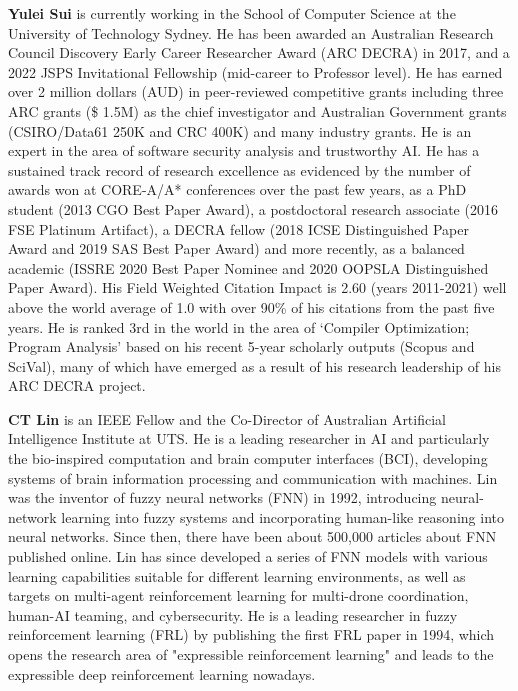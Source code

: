 \textbf{Yulei Sui} is currently working in the School of Computer Science at the University of Technology Sydney. 
He has been awarded an Australian Research Council Discovery Early Career Researcher Award (ARC DECRA) in 2017, and a 2022 JSPS Invitational Fellowship (mid-career to Professor level). 
He has earned over 2 million dollars (AUD) in peer-reviewed competitive grants including three ARC grants (\$ 1.5M) as the chief investigator and Australian Government grants (CSIRO/Data61 250K and CRC 400K) and many industry grants.
He is an expert in the area of software security analysis and trustworthy AI.
He has a sustained track record of research excellence as evidenced by the number of awards won at CORE-A/A* conferences over the past few years, as a PhD student (2013 CGO Best Paper Award), a postdoctoral research associate (2016 FSE Platinum Artifact), a DECRA fellow (2018 ICSE Distinguished Paper Award and 2019 SAS Best Paper Award) and more recently, as a balanced academic (ISSRE 2020 Best Paper Nominee and 2020 OOPSLA Distinguished Paper Award). His Field Weighted Citation Impact is 2.60 (years 2011-2021) well above the world average of 1.0 with over 90\% of his citations from the past five years. 
He is ranked 3rd in the world in the area of `Compiler Optimization; Program Analysis' based on his recent 5-year scholarly outputs (Scopus and SciVal), many of which have emerged as a result of his research leadership of his ARC DECRA project.


\textbf{CT Lin} is an IEEE Fellow and the Co-Director of Australian Artificial Intelligence Institute at UTS.  He is a leading researcher in AI and particularly the bio-inspired computation and brain computer interfaces (BCI), developing systems of brain information processing and communication with machines. Lin was the inventor of fuzzy neural networks (FNN) in 1992, introducing neural-network learning into fuzzy systems and incorporating human-like reasoning into neural networks.  Since then, there have been about 500,000 articles about FNN published online. Lin has since developed a series of FNN models with various learning capabilities suitable for different learning environments, as well as targets on multi-agent reinforcement learning for multi-drone coordination, human-AI teaming, and cybersecurity. He is a leading researcher in fuzzy reinforcement learning (FRL) by publishing the first FRL paper in 1994, which opens the research area of "expressible reinforcement learning" and leads to the expressible deep reinforcement learning nowadays.

